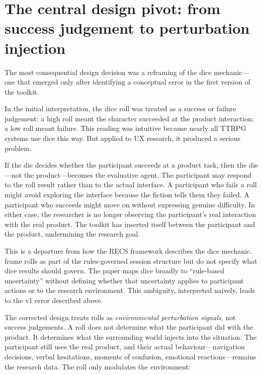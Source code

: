 \documentclass[12pt,a4paper]{report}
\begin{document}
\section{The central design pivot: from success judgement to perturbation injection}
\label{sec:pivot}

The most consequential design decision was a reframing of the dice mechanic---one that
emerged only after identifying a conceptual error in the first version of the toolkit.

In the initial interpretation, the dice roll was treated as a success or failure
judgement: a high roll meant the character succeeded at the product interaction; a low
roll meant failure.
This reading was intuitive because nearly all TTRPG systems use dice this way.
But applied to UX research, it produced a serious problem.

If the die decides whether the participant succeeds at a product task, then the
die---not the product---becomes the evaluative agent.
The participant may respond to the roll result rather than to the actual interface.
A participant who fails a roll might avoid exploring the interface because the fiction
tells them they failed.
A participant who succeeds might move on without expressing genuine difficulty.
In either case, the researcher is no longer observing the participant's real interaction
with the real product.
The toolkit has inserted itself between the participant and the product, undermining the
research goal.

This is a departure from how the RECS framework describes the dice mechanic.
\citet{sturdee2023ttrpg} frame rolls as part of the rules-governed session structure but
do not specify what dice results should govern.
The paper maps dice broadly to ``rule-based uncertainty'' without defining whether that
uncertainty applies to participant actions or to the research environment.
This ambiguity, interpreted naively, leads to the v1 error described above.

The corrected design treats rolls as \emph{environmental perturbation signals}, not
success judgements.
A roll does not determine what the participant did with the product.
It determines what the surrounding world injects into the situation.
The participant still uses the real product, and their actual behaviour---navigation
decisions, verbal hesitations, moments of confusion, emotional reactions---remains the
research data.
The roll only modulates the environment:
\end{document}
